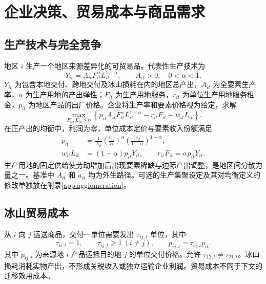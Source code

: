 \documentclass[UTF8,a4paper,zihao=-4,fontset=windows]{ctexart}
\numberwithin{equation}{section}
\begin{document}
\section{企业决策、贸易成本与商品需求}
\label{sec:firms-trade}

\subsection{生产技术与完全竞争}
地区 $i$ 生产一个地区来源差异化的可贸易品。代表性生产技术为
\begin{equation}
  Y_{it}=A_{it}F_{it}^{\alpha}L_{it}^{1-\alpha},
  \qquad A_{it}>0,\quad 0<\alpha<1.
  \label{eq:production}
\end{equation}
$Y_{it}$ 为包含本地交付、跨地交付及冰山损耗在内的地区总产出，$A_{it}$ 为全要素生产率，$\alpha$ 为生产用地的产出弹性；$F_{it}$ 为生产用地服务，$r_{it}$ 为单位生产用地服务租金，$p_{it}$ 为地区产品的出厂价格。企业将生产率和要素价格视为给定，求解
\begin{equation}
  \max_{F_{it},L_{it}\geq0}
  \left\{p_{it}A_{it}F_{it}^{\alpha}L_{it}^{1-\alpha}
      -r_{it}F_{it}-w_{it}L_{it}\right\}.
  \label{eq:firm-problem}
\end{equation}
在正产出的均衡中，利润为零，单位成本定价与要素收入份额满足
\begin{align}
  p_{it}&=\frac{1}{A_{it}}
    \left(\frac{r_{it}}{\alpha}\right)^{\alpha}
    \left(\frac{w_{it}}{1-\alpha}\right)^{1-\alpha},
    \label{eq:unit-cost}\\
  w_{it}L_{it}&=(1-\alpha)p_{it}Y_{it},\qquad
  r_{it}F_{it}=\alpha p_{it}Y_{it}.
  \label{eq:factor-payments}
\end{align}
生产用地的固定供给使劳动增加后出现要素稀缺与边际产出调整，是地区间分散力量之一。基准中 $A_{it}$ 和 $a_{it}$ 均为外生路径。可选的生产集聚设定及其对均衡定义的修改单独放在附录\ref{app:agglomeration}。

\subsection{冰山贸易成本}
从 $i$ 向 $j$ 运送商品，交付一单位需要发出 $\tau_{ij,t}$ 单位，其中
\begin{equation}
  \tau_{ii,t}=1,\qquad \tau_{ij,t}\geq1\ (i\ne j),\qquad
  p_{ij,t}=\tau_{ij,t}p_{it}.
  \label{eq:iceberg}
\end{equation}
其中 $p_{ij,t}$ 为来源地 $i$ 产品运抵目的地 $j$ 的单位交付价格。允许 $\tau_{12,t}\ne\tau_{21,t}$。冰山损耗消耗实物产出，不形成关税收入或独立运输企业利润。贸易成本不同于下文的迁移效用成本。
\end{document}
